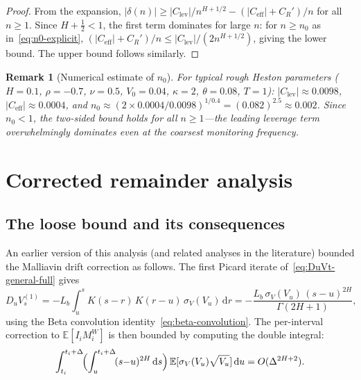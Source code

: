 \documentclass[12pt]{article}
\newtheorem{remark}{Remark}
\theoremstyle{definition}
\newcommand{\E}{\mathbb{E}}
\newcommand{\dd}{\mathrm{d}}
\begin{document}
\begin{proof}
From the expansion,
$|\delta(n)| \ge |C_{\mathrm{lev}}|/n^{H+1/2}
- (|C_{\mathrm{eff}}| + C_R')/n$
for all $n \ge 1$.
Since $H + \tfrac12 < 1$, the first term dominates for large $n$:
for $n \ge n_0$ as in~\eqref{eq:n0-explicit},
$(|C_{\mathrm{eff}}| + C_R')/n \le |C_{\mathrm{lev}}|/(2n^{H+1/2})$,
giving the lower bound.
The upper bound follows similarly.
\end{proof}

\begin{remark}[Numerical estimate of $n_0$]
For typical rough Heston parameters
($H = 0.1$, $\rho = -0.7$, $\nu = 0.5$, $V_0 = 0.04$,
$\kappa = 2$, $\theta = 0.08$, $T = 1$):
$|C_{\mathrm{lev}}| \approx 0.0098$,
$|C_{\mathrm{eff}}| \approx 0.0004$,
and $n_0 \approx (2 \times 0.0004/0.0098)^{1/0.4}
= (0.082)^{2.5} \approx 0.002$.
Since $n_0 < 1$, the two-sided bound holds for \emph{all}
$n \ge 1$---the leading leverage term overwhelmingly dominates
even at the coarsest monitoring frequency.
\end{remark}

\section{Corrected remainder analysis}\label{sec:remainder}

\subsection{The loose bound and its consequences}

An earlier version of this analysis (and related analyses in the
literature) bounded the Malliavin drift correction as follows.
The first Picard iterate of~\eqref{eq:DuVt-general-full} gives
\begin{equation}\label{eq:picard-iterate}
  D_u V_s^{(1)} = -L_b\!\int_u^s\! K(s{-}r)\,K(r{-}u)\,
  \sigma_V(V_u)\,\dd r
  = -\frac{L_b\,\sigma_V(V_u)\,(s{-}u)^{2H}}{\Gamma(2H{+}1)},
\end{equation}
using the Beta convolution identity~\eqref{eq:beta-convolution}.
The per-interval correction to $\E[I_i M_i^W]$ is then bounded by
computing the double integral:
\begin{equation}\label{eq:loose-step}
  \int_{t_i}^{t_i+\Delta}\!
  \Bigl(\int_u^{t_i+\Delta}\!
  (s{-}u)^{2H}\,\dd s\Bigr)\,
  \E[\sigma_V(V_u)\sqrt{V_u}]\,\dd u
  = O(\Delta^{2H+2}).
\end{equation}
\end{document}
